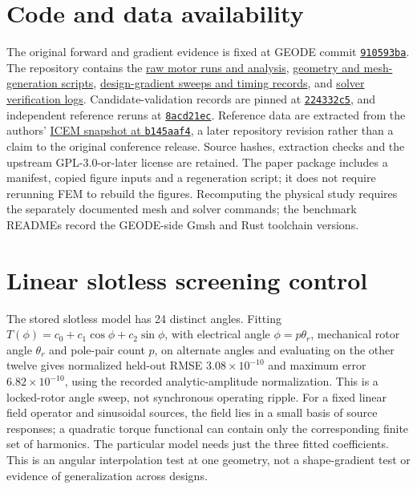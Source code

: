 \documentclass{anvil-paper}
\begin{document}
\section*{Code and data availability}
The original forward and gradient evidence is fixed at GEODE commit
\href{https://github.com/rjwalters/geode-fem/tree/910593bad6f64f9f01671c2632b57034e72b9c61}{\texttt{910593ba}}.
The repository contains the
\href{https://github.com/rjwalters/geode-fem/tree/910593bad6f64f9f01671c2632b57034e72b9c61/benchmarks/motor_reference/forward_harmonic}{raw motor runs and analysis},
\href{https://github.com/rjwalters/geode-fem/tree/910593bad6f64f9f01671c2632b57034e72b9c61/benchmarks/motor_reference/geometry}{geometry and mesh-generation scripts},
\href{https://github.com/rjwalters/geode-fem/tree/910593bad6f64f9f01671c2632b57034e72b9c61/benchmarks/motor_shape_gradient/design}{design-gradient sweeps and timing records},
and \href{https://github.com/rjwalters/geode-fem/tree/910593bad6f64f9f01671c2632b57034e72b9c61/benchmarks/motor_nonlinear_m1}{solver verification logs}.
Candidate-validation records are pinned at
\href{https://github.com/rjwalters/geode-fem/tree/224332c526be1191183af82b610973c7778de720/benchmarks/motor_validation}{\texttt{224332c5}},
and independent reference reruns at
\href{https://github.com/rjwalters/geode-fem/tree/8acd21ecf85d89fe077275a3c04ca70b53963d43/benchmarks/motor_reference/reference_refinement}{\texttt{8acd21ec}}.
Reference data are extracted from the authors'
\href{https://github.com/MichaelWiesheu/ICEMsnapshot/tree/b145aaf4ab1a6424828bc941eaf172f48fa0d458}{ICEM snapshot at \texttt{b145aaf4}},
a later repository revision rather than a claim to the original conference
release. Source hashes, extraction checks and the upstream GPL-3.0-or-later license
are retained. The paper package includes a manifest, copied figure inputs
and a regeneration script; it does not require rerunning FEM to rebuild
the figures. Recomputing the physical study requires the separately
documented mesh and solver commands; the benchmark READMEs record the
GEODE-side Gmsh and Rust toolchain versions.

\appendix
\section{Linear slotless screening control}\label{sec:slotless}
The stored slotless model has 24 distinct angles. Fitting
$T(\phi)=c_0+c_1\cos\phi+c_2\sin\phi$, with electrical angle $\phi=p\theta_r$, mechanical rotor angle $\theta_r$
and pole-pair count $p$, on alternate angles and
evaluating on the other twelve gives normalized held-out RMSE
$3.08\times10^{-10}$ and maximum error $6.82\times10^{-10}$, using the
recorded analytic-amplitude normalization. This is a locked-rotor angle sweep,
not synchronous operating ripple. For a fixed linear field operator and
sinusoidal sources, the field lies in a small basis of source responses;
a quadratic torque functional can contain only the corresponding finite
set of harmonics. The particular model needs just the three fitted
coefficients. This is an angular interpolation test at one geometry,
not a shape-gradient test or evidence of generalization across designs.
\end{document}
